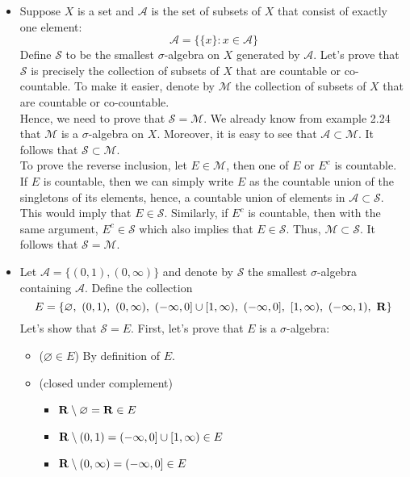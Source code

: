 \begin{solution}
    \begin{itemize}
        \item Suppose $X$ is a set and $\mathcal{A}$ is the set of subsets of $X$ that consist of exactly one element:
        $$\mathcal{A} = \{\{x\}:x\in \mathcal{A}\}$$
        Define $\mathcal{S}$ to be the smallest $\sigma$-algebra on $X$ generated by $\mathcal{A}$. Let's prove that $\mathcal{S}$ is precisely the collection of subsets of $X$ that are countable or co-countable. To make it easier, denote by $\mathcal{M}$ the collection of subsets of $X$ that are countable or co-countable. \\
        Hence, we need to prove that $\mathcal{S} = \mathcal{M}$. We already know from example 2.24 that $\mathcal{M}$ is a $\sigma$-algebra on $X$. Moreover, it is easy to see that $\mathcal{A} \subset \mathcal{M}$. It follows that $\mathcal{S} \subset \mathcal{M}$.\\
        To prove the reverse inclusion, let $E \in \mathcal{M}$, then one of $E$ or $E^c$ is countable. If $E$ is countable, then we can simply write $E$ as the countable union of the singletons of its elements, hence, a countable union of elements in $\mathcal{A} \subset \mathcal{S}$. This would imply that $E \in \mathcal{S}$. Similarly, if $E^c$ is countable, then with the same argument, $E^c \in \mathcal{S}$ which also implies that $E \in \mathcal{S}$. Thus, $\mathcal{M} \subset \mathcal{S}$. It follows that $\mathcal{S} = \mathcal{M}$.
        \item Let $\mathcal{A} = \{(0,1), (0, \infty)\}$ and denote by $\mathcal{S}$ the smallest $\sigma$-algebra containing $\mathcal{A}$. Define the collection 
        $$E = \{\varnothing, \ (0,1), \ (0, \infty), \ (-\infty, 0]\cup[1, \infty), \ (-\infty, 0], \ [1, \infty), \ (-\infty, 1), \ \R\}$$
        Let's show that $\mathcal{S} = E$. First, let's prove that $E$ is a $\sigma$-algebra:
        \begin{itemize}
            \item ($\varnothing \in E$) By definition of $E$.
            \item (closed under complement) 
            \begin{itemize}
                \item $\mathbf{R} \setminus \varnothing = \mathbf{R} \in E$
                \item $\mathbf{R} \setminus (0,1) = (-\infty, 0]\cup[1, \infty) \in E$
                \item $\mathbf{R} \setminus (0,\infty) = (-\infty, 0] \in E$

\end{itemize}
\end{itemize}
\end{itemize}
\end{solution}
